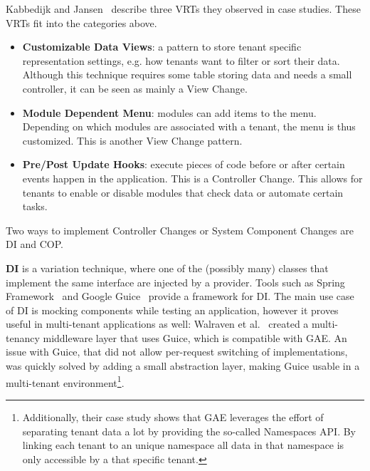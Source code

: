 Kabbedijk and Jansen~\cite{kabbedijk2011variability} describe three \acp{VRT} they observed in case studies. These \acp{VRT}  fit into the categories above.
\begin{itemize} 
\item \textbf{Customizable Data Views}: a pattern to store tenant specific representation settings, e.g. how tenants want to filter or sort their data. 
Although this technique requires some table storing data and needs a small controller, it can be seen as mainly a View Change.
\item \textbf{Module Dependent Menu}: modules can add items to the menu. Depending on which modules are associated with a tenant, the menu is thus customized. This is another View Change pattern. 
\item \textbf{Pre/Post Update Hooks}: execute pieces of code before or after certain events happen in the application. This is a Controller Change. 
This allows for tenants to enable or disable modules that check data or automate certain tasks.
\end{itemize}

Two ways to implement Controller Changes or System Component Changes are \acl{DI} and \acl{COP}.

\textbf{\acf{DI}} is a variation technique, where one of the (possibly many) classes that implement the same interface are injected by a provider. Tools such as Spring Framework~\cite{walls2005spring} and Google Guice~\cite{vanbrabant2008google} provide a framework for \ac{DI}. The main use case of \ac{DI} is mocking components while testing an application, however it proves useful in multi-tenant applications as well:
Walraven et al.~\cite{walraven2011middleware} created a multi-tenancy middleware layer that uses Guice, which is compatible with \ac{GAE}. An issue with Guice, that did not allow per-request switching of implementations, was quickly solved by adding a small abstraction layer, making Guice usable in a multi-tenant environment\footnote{
Additionally, their case study shows that \ac{GAE} leverages the effort of separating tenant data a lot by providing the so-called Namespaces API. By linking each tenant to an unique namespace all data in that namespace is only accessible by a that specific tenant.}.

